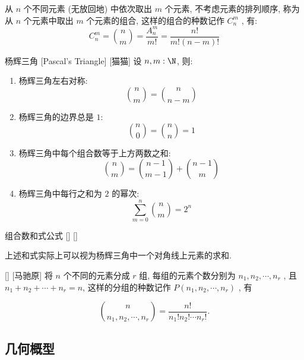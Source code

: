 \documentclass[UTF8]{ctexart}
\begin{document}
        \begin{prf}
            从 \(n\) 个不同元素 (无放回地) 中依次取出 \(m\) 个元素, 不考虑元素的排列顺序, 称为从 \(n\) 个元素中取出 \(m\) 个元素的组合, 这样的组合的种数记作 \(C_n^m\) , 有: 
            \[C_n^m=\binom{n}{m}=\frac{A_n^m}{m!}=\frac{n!}{m!(n-m)!}\]
        \end{prf}

        \begin{ppt}
            []
            {杨辉三角}
            [Pascal's Triangle]
            [猫猫]
            设 \(n, m:\N\), 则:
            \begin{enumerate}
                \item 杨辉三角左右对称: 
                    \[\binom{n}{m}=\binom{n}{n-m}\]
                \item 杨辉三角的边界总是 \(1\): 
                    \[\binom{n}{0}=\binom{n}{n}=1\]
                \item 杨辉三角中每个组合数等于上方两数之和: 
                    \[\binom{n}{m}=\binom{n-1}{m-1}+\binom{n-1}{m}\]
                \item 杨辉三角中每行之和为 \(2\) 的幂次:
                    \[\sum_{m=0}^{n}\binom{n}{m}=2^n\]
            \end{enumerate}
        \end{ppt}

        \begin{ppt}
            []
            {组合数和式公式}
            []
            []
        \end{ppt}

        \begin{rmk}
            [猫猫]
            上述和式实际上可以视为杨辉三角中一个对角线上元素的求和. 
        \end{rmk}

        \begin{xmp}
            []
            {}
            []
            [马驰原]
            将 \(n\) 个不同的元素分成 \(r\) 组, 每组的元素个数分别为 \(n_1,n_2,\cdots,n_r\) , 且 \(n_1+n_2+\cdots+n_r=n\), 这样的分组的种数记作 \(P(n_1,n_2,\cdots,n_r)\) , 有
            
            \[\binom{n}{n_1,n_2,\cdots,n_r}=\frac{n!}{n_1!n_2!\cdots n_r!}.\]
        \end{xmp}
    
    \subsection{几何概型}
        
\end{document}
